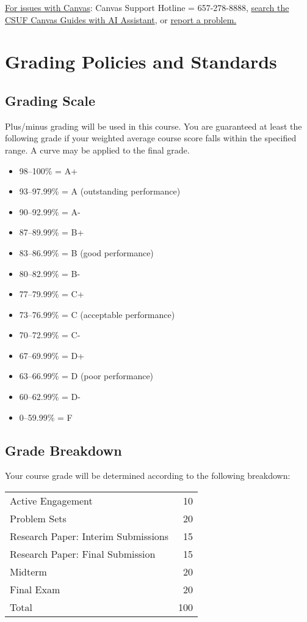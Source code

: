 \documentclass{./../Latex/syllabus}
\begin{document}
\noindent \underline{For issues with Canvas}: Canvas Support Hotline = 657-278-8888, \href{https://canvashelp.fullerton.edu/}{search the CSUF Canvas Guides with AI Assistant}, or \href{https://titans.service-now.com/sp?id=sc_cat_item&sys_id=f88efe80ebea6a10fb7cfcffcad0cdc6&subject=Canvas}{report a problem.}

\section*{Grading Policies and Standards}

\subsection*{Grading Scale}

Plus/minus grading will be used in this course. You are guaranteed at least the following grade if your weighted average course score falls within the specified range. A curve may be applied to the final grade.

\begin{itemize}
\item[] 98--100\% = A+ 
\item[] 93--97.99\% = A (outstanding performance) 
\item[] 90--92.99\% = A- 
\item[] 87--89.99\% = B+ 
\item[] 83--86.99\% = B (good performance) 
\item[] 80--82.99\% = B- 
\item[] 77--79.99\% = C+ 
\item[] 73--76.99\% = C (acceptable performance) 
\item[] 70--72.99\% = C- 
\item[] 67--69.99\% = D+ 
\item[] 63--66.99\% = D (poor performance) 
\item[] 60--62.99\% = D- 
\item[] 0--59.99\% = F 
\end{itemize}

\subsection*{Grade Breakdown}

Your course grade will be determined according to the following breakdown:

\begin{center}
\begin{tabularx}{0.65\textwidth}{Xr}
\hline
Active Engagement & 10 \\
Problem Sets & 20 \\
Research Paper: Interim Submissions & 15 \\
Research Paper: Final Submission & 15 \\
Midterm & 20 \\
Final Exam & 20 \\
\hline
Total & 100 \\
\hline
\end{tabularx}
\end{center}
\end{document}
